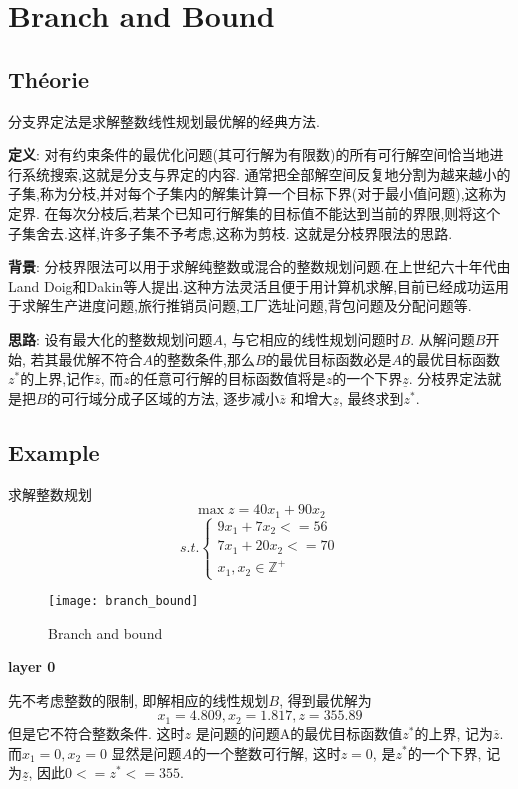 \chapter{Branch and Bound}
\section{Th\'eorie}
分支界定法是求解整数线性规划最优解的经典方法.

\textbf{定义}:
对有约束条件的最优化问题(其可行解为有限数)的所有可行解空间恰当地进行系统搜索,这就是分支与界定的内容.
通常把全部解空间反复地分割为越来越小的子集,称为分枝,并对每个子集内的解集计算一个目标下界(对于最小值问题),这称为定界.
在每次分枝后,若某个已知可行解集的目标值不能达到当前的界限,则将这个子集舍去.这样,许多子集不予考虑,这称为剪枝.
这就是分枝界限法的思路.

\textbf{背景}:
分枝界限法可以用于求解纯整数或混合的整数规划问题.在上世纪六十年代由Land Doig和Dakin等人提出.这种方法灵活且便于用计算机求解,目前已经成功运用于求解生产进度问题,旅行推销员问题,工厂选址问题,背包问题及分配问题等.

\textbf{思路}:
设有最大化的整数规划问题$A$, 与它相应的线性规划问题时$B$.
从解问题$B$开始, 若其最优解不符合$A$的整数条件,那么$B$的最优目标函数必是$A$的最优目标函数$z^*$的上界,记作$\overline{z}$, 而$z$的任意可行解的目标函数值将是$z$的一个下界$\underline{z}$.
分枝界定法就是把$B$的可行域分成子区域的方法, 逐步减小$\overline{z}$ 和增大$\underline{z}$, 最终求到$z^*$.

\section{Example}
求解整数规划
$$ \max z = 40 x_1 + 90 x_2 $$
$$
s.t.
\begin{cases}
9 x_1 + 7 x_2 <= 56 \\
7 x_1 + 20 x_2 <= 70 \\
x_1, x_2 \in \mathbb{Z}^+
\end{cases}
$$

\immediate{}
\begin{figure}[htbp]
	\centering
	\texttt{[image: branch\_bound]}\\
	\caption{Branch and bound}\label{fig.branch_bound}
\end{figure}

\textbf{layer 0}\par
先不考虑整数的限制, 即解相应的线性规划$B$, 得到最优解为
$$ x_1 = 4.809, x_2 = 1.817, z = 355.89$$
但是它不符合整数条件. 这时$z$ 是问题的问题A的最优目标函数值$z^*$的上界, 记为$\overline{z}$.
而$x_1 = 0, x_2 = 0$ 显然是问题$A$的一个整数可行解, 这时$z = 0$, 是$z^*$的一个下界, 记为$\underline{z}$, 因此$0 <= z^* <= 355$.

